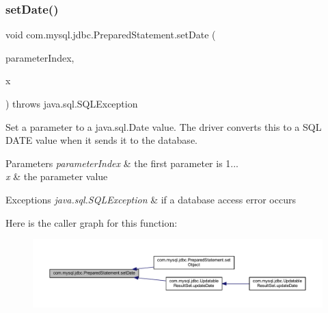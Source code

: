 \subsubsection{\texorpdfstring{set\+Date()}{setDate()}\hspace{0.1cm}{\footnotesize\ttfamily [1/2]}}
{\footnotesize\ttfamily void com.\+mysql.\+jdbc.\+Prepared\+Statement.\+set\+Date (\begin{DoxyParamCaption}\item[{int}]{parameter\+Index,  }\item[{java.\+sql.\+Date}]{x }\end{DoxyParamCaption}) throws java.\+sql.\+S\+Q\+L\+Exception}

Set a parameter to a java.\+sql.\+Date value. The driver converts this to a S\+QL D\+A\+TE value when it sends it to the database.


\begin{DoxyParams}{Parameters}
{\em parameter\+Index} & the first parameter is 1... \\
\hline
{\em x} & the parameter value\\
\hline
\end{DoxyParams}

\begin{DoxyExceptions}{Exceptions}
{\em java.\+sql.\+S\+Q\+L\+Exception} & if a database access error occurs \\
\hline
\end{DoxyExceptions}
Here is the caller graph for this function\+:
\nopagebreak
\begin{figure}[H]
\begin{center}
\leavevmode
\includegraphics[width=350pt]{classcom_1_1mysql_1_1jdbc_1_1_prepared_statement_a7fff0e5cc0d3a8205620da02c39f4673_icgraph}
\end{center}
\end{figure}
\mbox{\label{classcom_1_1mysql_1_1jdbc_1_1_prepared_statement_aea55e79f823b386bf3525f1f147cd272}} 
